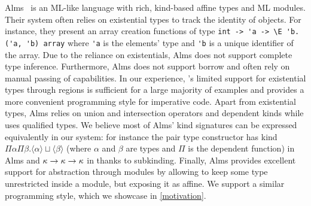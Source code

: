 Alms~\citep{DBLP:conf/popl/TovP11} is an ML-like language with rich, kind-based
affine types and ML modules.
Their system often relies on existential types to track the identity
of objects. For instance, they present an array creation
functions of type \lstinline/int -> 'a -> \E 'b. ('a, 'b) array/ where
\lstinline/'a/ is the elements' type and \lstinline/'b/
is a unique identifier of the array.
Due to the reliance on existentials, Alms does not support complete type inference.
Furthermore, Alms does not support borrow and often rely
on manual passing of capabilities.
In our experience, \affe's limited support for existential types through
regions is sufficient for a large majority of examples and provides
a more convenient programming style for imperative code.
%
Apart from existential types, Alms relies
on union and intersection operators and dependent kinds while
\lang uses qualified types.
We believe most of Alms' kind signatures can be expressed equivalently in
our system: for instance the pair type constructor
has kind $\Pi\alpha\Pi\beta. \langle\alpha\rangle \sqcup \langle\beta\rangle$
(where $\alpha$ and $\beta$ are types and $\Pi$ is the dependent function)
in Alms and $\kappa\to\kappa\to\kappa$ in \lang thanks
to subkinding.
%
Finally, Alms provides excellent support for abstraction through
modules by allowing to keep some type unrestricted inside a module, but
exposing it as affine. We support a similar programming style, which
we showcase in \cref{motivation}.

